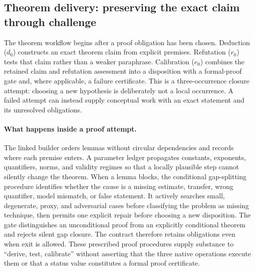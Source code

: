 

\subsection{Theorem delivery: preserving the exact claim through challenge}
\label{app:granular-theorem-proof-delivery}
The theorem workflow begins after a proof obligation has been chosen. Deduction
($d_0$) constructs an exact theorem claim from explicit premises. Refutation
($r_0$) tests that claim rather than a weaker paraphrase. Calibration ($e_0$)
combines the retained claim and refutation assessment into a disposition with a
formal-proof gate and, where applicable, a failure certificate. This is a
three-occurrence closure attempt: choosing a new hypothesis is deliberately not
a local occurrence. A failed attempt can instead supply conceptual work with an
exact statement and its unresolved obligations.

\paragraph{What happens inside a proof attempt.}
The linked builder orders lemmas without circular dependencies and records where
each premise enters. A parameter ledger propagates constants, exponents,
quantifiers, norms, and validity regimes so that a locally plausible step cannot
silently change the theorem. When a lemma blocks, the conditional gap-splitting
procedure identifies whether the cause is a missing estimate, transfer, wrong
quantifier, model mismatch, or false statement. It actively searches small,
degenerate, proxy, and adversarial cases before classifying the problem as missing
technique, then permits one explicit repair before choosing a new disposition.
The gate distinguishes an unconditional proof from an explicitly conditional
theorem and rejects silent gap closure. The contract therefore retains obligations
even when exit is allowed. These prescribed proof procedures supply substance to
``derive, test, calibrate'' without asserting that the three native operations
execute them or that a status value constitutes a formal proof certificate.

